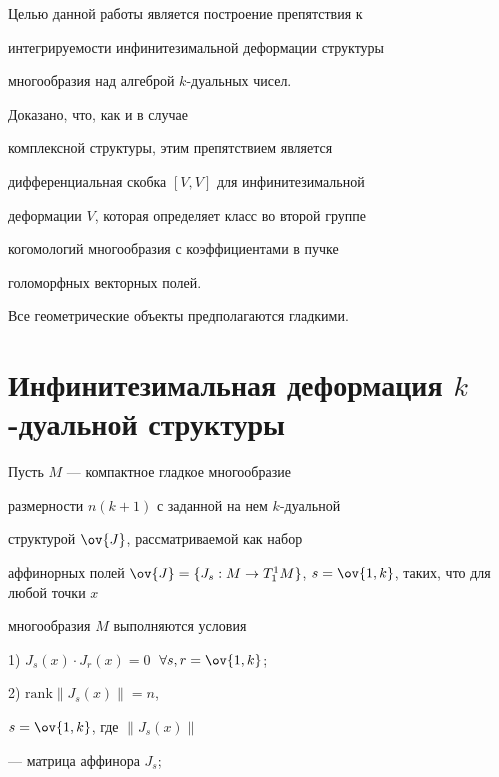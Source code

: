 \label{begin}








Целью данной работы является построение препятствия к


интегрируемости инфинитезимальной деформации структуры


многообразия над алгеброй $k$-дуальных чисел. 


Доказано, что, как и в случае


комплексной структуры, этим препятствием является


дифференциальная скобка $[V,V]$ для инфинитезимальной


деформации $V$, которая определяет класс во второй группе


когомологий многообразия с коэффициентами в пучке


голоморфных векторных полей.





Все геометрические объекты предполагаются гладкими.





\section{Инфинитезимальная деформация $k$-дуальной структуры}





Пусть $M$ --- компактное гладкое многообразие


размерности $n(k+1)$ с заданной на нем $k$-дуальной


структурой $\ov{J}$, рассматриваемой как набор


аффинорных полей $\ov{J}=\{J_{s}: M \to


T^1_1M\}$, $s=\ov{1,k}$, таких, что для любой точки $x$


многообразия $M$ выполняются условия





1) $J_{s}(x)\cdot J_{r}(x)=0$ $\;\forall s, r =\ov{1,k}$;





2) $\text{rank} \| J_{s}(x) \|=n$,


$s=\ov{1,k}$, где $\| J_{s}(x) \|$


--- матрица аффинора $J_{s}$;





